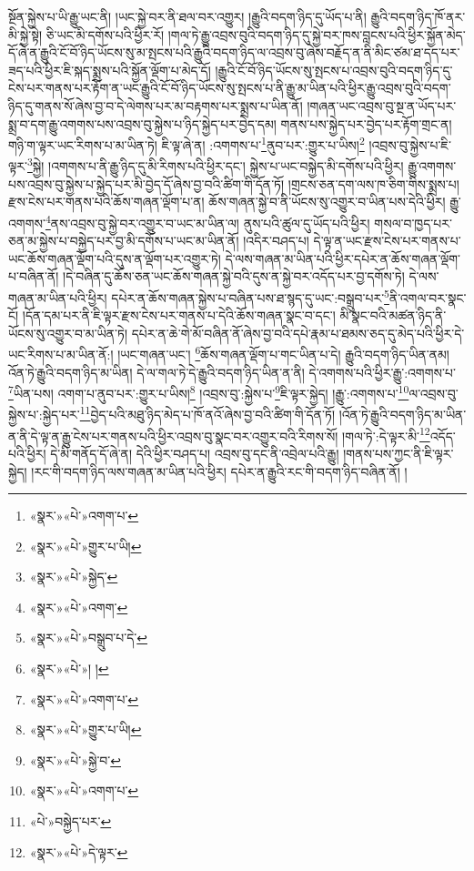 སྔོན་སྐྱེས་པ་ཡི་རྒྱུ་ཡང་ནི། །ཡང་སྐྱེ་བར་ནི་ཐལ་བར་འགྱུར། །རྒྱུའི་བདག་ཉིད་དུ་ཡོད་པ་ནི། རྒྱུའི་བདག་ཉིད་ཁོ་ནར་མི་སྐྱེ་སྟེ། ཅི་ཡང་མི་དགོས་པའི་ཕྱིར་རོ། །གལ་ཏེ་རྒྱུ་འབྲས་བུའི་བདག་ཉིད་དུ་སྐྱེ་བར་ཁས་བླངས་པའི་ཕྱིར་སྐྱོན་མེད་དོ་ཞེ་ན་རྒྱུའི་ངོ་བོ་ཉིད་ཡོངས་སུ་མ་སྤངས་པའི་རྒྱུའི་བདག་ཉིད་ལ་འབྲས་བུ་ཞེས་བརྗོད་ན་ནི་མིང་ཙམ་ཐ་དད་པར་ཟད་པའི་ཕྱིར་ཇི་སྐད་སྨྲས་པའི་སྐྱོན་ལྡོག་པ་མེད་དོ། །རྒྱུའི་ངོ་བོ་ཉིད་ཡོངས་སུ་སྤངས་པ་འབྲས་བུའི་བདག་ཉིད་དུ་ངེས་པར་གནས་པར་རྟོག་ན་ཡང་རྒྱུའི་ངོ་བོ་ཉིད་ཡོངས་སུ་སྤངས་པ་ནི་རྒྱུ་མ་ཡིན་པའི་ཕྱིར་རྒྱུ་འབྲས་བུའི་བདག་ཉིད་དུ་གནས་སོ་ཞེས་བྱ་བ་དེ་ལེགས་པར་མ་བརྟགས་པར་སྨྲས་པ་ཡིན་ནོ། །གཞན་ཡང་འབྲས་བུ་སྔ་ན་ཡོད་པར་སྨྲ་བ་དག་རྒྱུ་འགགས་པས་འབྲས་བུ་སྐྱེས་པ་ཉིད་སྐྱེད་པར་བྱེད་དམ། གནས་པས་སྐྱེད་པར་བྱེད་པར་རྟོག་གྲང་ན། གཉི་ག་ལྟར་ཡང་རིགས་པ་མ་ཡིན་ཏེ། ཇི་ལྟ་ཞེ་ན། :འགགས་པ་\footnote{«སྣར་»«པེ་»འགག་པ་}ནུབ་པར་:གྱུར་པ་ཡིས།\footnote{«སྣར་»«པེ་»གྱུར་པ་ཡི།} །འབྲས་བུ་སྐྱེས་པ་ཇི་ལྟར་\footnote{«སྣར་»«པེ་»སྐྱེད་}སྐྱེ། །འགགས་པ་ནི་རྒྱུ་ཉིད་དུ་མི་རིགས་པའི་ཕྱིར་དང་། སྐྱེས་པ་ཡང་བསྐྱེད་མི་དགོས་པའི་ཕྱིར། རྒྱུ་འགགས་པས་འབྲས་བུ་སྐྱེས་པ་སྐྱེད་པར་མི་བྱེད་དོ་ཞེས་བྱ་བའི་ཚིག་གི་དོན་ཏོ། །གྲངས་ཅན་དག་ལས་ཁ་ཅིག་གིས་སྨྲས་པ། རྫས་ངེས་པར་གནས་པའི་ཆོས་གཞན་ལྡོག་པ་ན། ཆོས་གཞན་སྐྱེ་བ་ནི་ཡོངས་སུ་འགྱུར་བ་ཡིན་པས་དེའི་ཕྱིར། རྒྱུ་འགགས་\footnote{«སྣར་»«པེ་»འགག་}ནས་འབྲས་བུ་སྐྱེ་བར་འགྱུར་བ་ཡང་མ་ཡིན་ལ། ནུས་པའི་ཚུལ་དུ་ཡོད་པའི་ཕྱིར། གསལ་བ་ཁྱད་པར་ཅན་མ་སྐྱེས་པ་བསྐྱེད་པར་བྱ་མི་དགོས་པ་ཡང་མ་ཡིན་ནོ། །འདིར་བཤད་པ། དེ་ལྟ་ན་ཡང་རྫས་ངེས་པར་གནས་པ་ཡང་ཆོས་གཞན་ལྡོག་པའི་དུས་ན་ལྡོག་པར་འགྱུར་ཏེ། དེ་ལས་གཞན་མ་ཡིན་པའི་ཕྱིར་དཔེར་ན་ཆོས་གཞན་ལྡོག་པ་བཞིན་ནོ། །དེ་བཞིན་དུ་ཆོས་ཅན་ཡང་ཆོས་གཞན་སྐྱེ་བའི་དུས་ན་སྐྱེ་བར་འདོད་པར་བྱ་དགོས་ཏེ། དེ་ལས་གཞན་མ་ཡིན་པའི་ཕྱིར། དཔེར་ན་ཆོས་གཞན་སྐྱེས་པ་བཞིན་པས་ཐ་སྙད་དུ་ཡང་:བསྒྲུབ་པར་\footnote{«སྣར་»«པེ་»བསྒྲུབ་པ་དེ་}ནི་འགལ་བར་སྣང་ངོ། །དོན་དམ་པར་ནི་ཇི་ལྟར་རྫས་ངེས་པར་གནས་པ་དེའི་ཆོས་གཞན་སྣང་བ་དང་། མི་སྣང་བའི་མཚན་ཉིད་ནི་ཡོངས་སུ་འགྱུར་བ་མ་ཡིན་ཏེ། དཔེར་ན་ཆེ་གེ་མོ་བཞིན་ནོ་ཞེས་བྱ་བའི་དཔེ་རྣམ་པ་ཐམས་ཅད་དུ་མེད་པའི་ཕྱིར་དེ་ཡང་རིགས་པ་མ་ཡིན་ནོ:། །ཡང་གཞན་ཡང་། \footnote{«སྣར་»«པེ་»། ། }ཆོས་གཞན་ལྡོག་པ་གང་ཡིན་པ་དེ། རྒྱུའི་བདག་ཉིད་ཡིན་ནམ། འོན་ཏེ་རྒྱུའི་བདག་ཉིད་མ་ཡིན། དེ་ལ་གལ་ཏེ་དེ་རྒྱུའི་བདག་ཉིད་ཡིན་ན་ནི། དེ་འགགས་པའི་ཕྱིར་རྒྱུ་:འགགས་པ་\footnote{«སྣར་»«པེ་»འགག་པ་}ཡིན་པས། འགག་པ་ནུབ་པར་:གྱུར་པ་ཡིས།\footnote{«སྣར་»«པེ་»གྱུར་པ་ཡི།} །འབྲས་བུ་:སྐྱེས་པ་\footnote{«སྣར་»«པེ་»སྐྱེ་བ་}ཇི་ལྟར་སྐྱེད། །རྒྱུ་:འགགས་པ་\footnote{«སྣར་»«པེ་»འགག་པ་}ལ་འབྲས་བུ་སྐྱེས་པ་:སྐྱེད་པར་\footnote{«པེ་»བསྐྱེད་པར་}བྱེད་པའི་མཐུ་ཉིད་མེད་པ་ཁོ་ནའོ་ཞེས་བྱ་བའི་ཚིག་གི་དོན་ཏོ། །འོན་ཏེ་རྒྱུའི་བདག་ཉིད་མ་ཡིན་ན་ནི་དེ་ལྟ་ན་རྒྱུ་ངེས་པར་གནས་པའི་ཕྱིར་འབྲས་བུ་སྣང་བར་འགྱུར་བའི་རིགས་སོ། །གལ་ཏེ་:དེ་ལྟར་མི་\footnote{«སྣར་»«པེ་»དེ་ལྟར་}འདོད་པའི་ཕྱིར། དེ་མི་གནོད་དོ་ཞེ་ན། དེའི་ཕྱིར་བཤད་པ། འབྲས་བུ་དང་ནི་འབྲེལ་པའི་རྒྱུ། །གནས་པས་ཀྱང་ནི་ཇི་ལྟར་སྐྱེད། །རང་གི་བདག་ཉིད་ལས་གཞན་མ་ཡིན་པའི་ཕྱིར། དཔེར་ན་རྒྱུའི་རང་གི་བདག་ཉིད་བཞིན་ནོ། །
